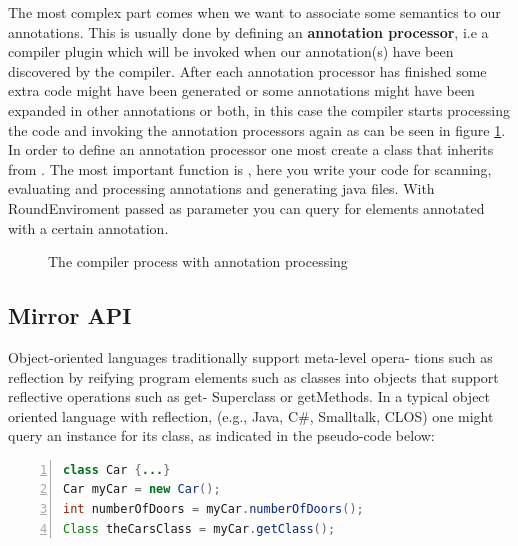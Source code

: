 	The most complex part comes when we want to associate some semantics 
to our annotations. This is usually done by defining an 
\textbf{annotation processor}, i.e a compiler plugin which will be invoked when
our annotation(s) have been discovered by the compiler. After each 
annotation processor has finished some extra code might have been generated or
some annotations might have been expanded in other annotations or both, in 
this case the compiler starts processing the code and invoking the annotation
processors again as can be seen in figure \ref{fig:annProc}.
	 In order to define an annotation processor one most create a class that
inherits from . The
most important function is , here you write your code for scanning, evaluating 
and processing annotations and generating java files. With RoundEnviroment passed 
as parameter you can query for elements annotated with a certain annotation.
	
\begin{figure}
\centering
{}
\caption{The compiler process with annotation
processing\cite{figure:javac-flow}\label{fig:annProc}}
\end{figure}

\subsection{Mirror API}
	Object-oriented languages traditionally support meta-level opera- tions such as
reflection by reifying program elements such as classes into objects that support reflective operations such as get- Superclass or getMethods.
	In a typical object oriented language with reflection, (e.g., Java, C\#,
Smalltalk, CLOS) one might query an instance for its class, as indicated in the pseudo-code below:
\small
\begin{lstlisting}[language=Java,numbers=left]
class Car {...}
Car myCar = new Car();
int numberOfDoors = myCar.numberOfDoors(); 
Class theCarsClass = myCar.getClass();
\end{lstlisting}
\normalsize{}

